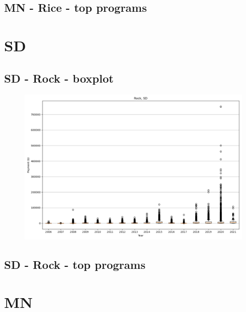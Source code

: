 \subsection*{MN - Rice - top programs}

\newpage
\section*{SD}
\subsection*{SD - Rock - boxplot}
\begin{figure}[h]
\centering
\includegraphics[width=7in]{../output/boxplots/counties/Rock-SD_boxplot.png}
\end{figure}


\subsection*{SD - Rock - top programs}

\newpage
\section*{MN}
